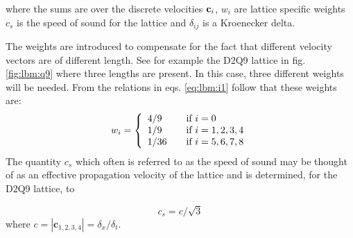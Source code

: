 
where the sums are over the discrete velocities $\mathbf{c}_i$, $w_i$ are
lattice specific weights $c_s$ is the speed of sound for the lattice
and $\delta_{ij}$ is a Kroenecker delta. 

The weights are introduced to compensate for the fact that different
velocity vectors are of different length. See for example the
D2Q9 lattice in fig. \ref{fig:lbm:q9} where three lengths are
present. In this case, three different weights will be needed. From
the relations in eqs. \eqref{eq:lbm:i1} follow that
these weights are: 
\begin{equation}\label{eq:lbm:weights}
w_i = 
\left\{
  \begin{array}{l l}
    4/9 & \quad \text{if $i = 0$}\\ 
    1/9 & \quad \text{if $i = 1, 2, 3, 4$}\\    
    1/36 & \quad \text{if $i = 5, 6, 7, 8$}\\
  \end{array} \right.
\end{equation}
The quantity $c_s$ which often is referred to as the speed of sound
may be thought of as an effective propagation velocity of the lattice
and is determined, for the D2Q9 lattice, to

\begin{equation}
c_s = c/\sqrt{3}
\end{equation} 
where $c = |\mathbf{c}_{1,2,3,4}| = \delta_x/\delta_t$.

